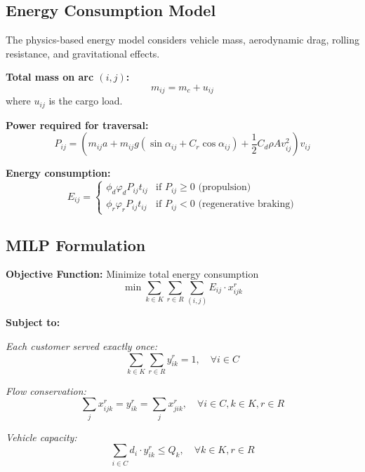 \documentclass[11pt,a4paper]{article}
\begin{document}
\subsection{Energy Consumption Model}

The physics-based energy model considers vehicle mass, aerodynamic drag, rolling resistance, and gravitational effects.

\textbf{Total mass on arc $(i,j)$:}
\begin{equation}
m_{ij} = m_c + u_{ij}
\end{equation}
where $u_{ij}$ is the cargo load.

\textbf{Power required for traversal:}
\begin{equation}
P_{ij} = \left( m_{ij} a + m_{ij} g \left( \sin\alpha_{ij} + C_r \cos\alpha_{ij} \right) + \frac{1}{2} C_d \rho A v_{ij}^2 \right) v_{ij}
\end{equation}

\textbf{Energy consumption:}
\begin{equation}
E_{ij} =
\begin{cases}
\phi_d \varphi_d P_{ij} t_{ij} & \text{if } P_{ij} \geq 0 \text{ (propulsion)} \\
\phi_r \varphi_r P_{ij} t_{ij} & \text{if } P_{ij} < 0 \text{ (regenerative braking)}
\end{cases}
\end{equation}

\subsection{MILP Formulation}

\textbf{Objective Function:} Minimize total energy consumption
\begin{equation}
\min \sum_{k \in K} \sum_{r \in R} \sum_{(i,j)} E_{ij} \cdot x_{ijk}^r
\end{equation}

\textbf{Subject to:}

\textit{Each customer served exactly once:}
\begin{equation}
\sum_{k \in K} \sum_{r \in R} y_{ik}^r = 1, \quad \forall i \in C
\end{equation}

\textit{Flow conservation:}
\begin{equation}
\sum_{j} x_{ijk}^r = y_{ik}^r = \sum_{j} x_{jik}^r, \quad \forall i \in C, k \in K, r \in R
\end{equation}

\textit{Vehicle capacity:}
\begin{equation}
\sum_{i \in C} d_i \cdot y_{ik}^r \leq Q_k, \quad \forall k \in K, r \in R
\end{equation}
\end{document}
